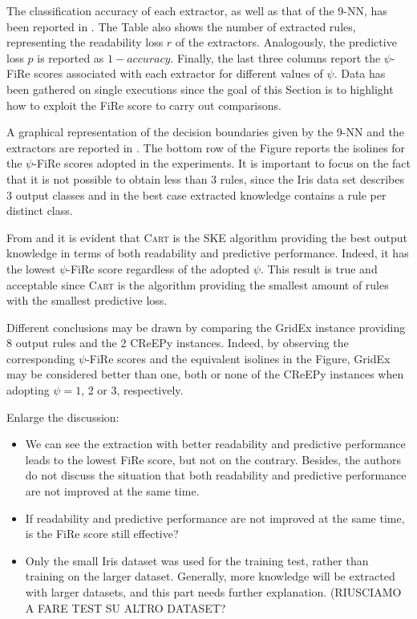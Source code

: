 \documentclass{article}
\newcommand{\gridex}{GridEx}
\newcommand{\creepy}{CReEPy}
\newcommand{\cart}{\textsc{Cart}}
\newcommand{\fire}{FiRe}
\newcommand{\psifire}{$\psi$-\fire}
\begin{document}
The classification accuracy of each extractor, as well as that of the 9-NN, has been reported in .
%
The Table also shows the number of extracted rules, representing the readability loss $r$ of the extractors.
%
Analogously, the predictive loss $p$ is reported as $1-accuracy$.
%
Finally, the last three columns report the \psifire{} scores associated with each extractor for different values of $\psi$.
%
Data has been gathered on single executions since the goal of this Section is to highlight how to exploit the \fire{} score to carry out comparisons.

A graphical representation of the decision boundaries given by the 9-NN and the extractors are reported in .
%
The bottom row of the Figure reports the isolines for the \psifire{} scores adopted in the experiments.
%
It is important to focus on the fact that it is not possible to obtain less than 3 rules, since the Iris data set describes 3 output classes and in the best case extracted knowledge contains a rule per distinct class.

From  and  it is evident that \cart{} is the SKE algorithm providing the best output knowledge in terms of both readability and predictive performance.
%
Indeed, it has the lowest \psifire{} score regardless of the adopted $\psi$.
%
This result is true and acceptable since \cart{} is the algorithm providing the smallest amount of rules with the smallest predictive loss.

Different conclusions may be drawn by comparing the \gridex{} instance providing 8 output rules and the 2 \creepy{} instances.
%
Indeed, by observing the corresponding \psifire{} scores and the equivalent isolines in the Figure, \gridex{} may be considered better than one, both or none of the \creepy{} instances when adopting $\psi=1$, 2 or 3, respectively.

{\color{red}
Enlarge the discussion: 
\begin{itemize}
\item We can see the extraction with better readability and predictive performance leads to the lowest FiRe score, but not on the contrary. Besides, the authors do not discuss the situation that both readability and predictive performance are not improved at the same time.
\item If readability and predictive performance are not improved at the same time, is the FiRe score still effective?
\item Only the small Iris dataset was used for the training test, rather than training on the larger dataset. Generally, more knowledge will be extracted with larger datasets, and this part needs further explanation. (RIUSCIAMO A FARE TEST SU ALTRO DATASET?
\end{itemize}
}
\end{document}
